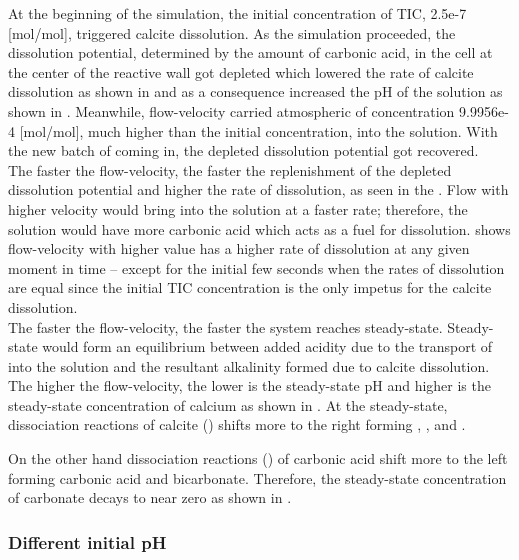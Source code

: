 At the beginning of the simulation, the initial concentration of TIC, 2.5e-7 [mol/mol], triggered calcite dissolution. 
As the simulation proceeded, the dissolution potential, determined by the amount of carbonic acid, in the cell at the center of the reactive wall
got depleted which lowered the rate of calcite dissolution as shown in  and as a consequence increased the pH of the solution as shown in 
. Meanwhile, flow-velocity carried atmospheric  of concentration 9.9956e-4 [mol/mol], much higher 
than the initial concentration, into the solution. With the new batch of  coming in, the depleted dissolution potential got recovered. \\

The faster the flow-velocity, the faster the replenishment of the depleted dissolution potential and 
higher the rate of dissolution, as seen in the . Flow with higher velocity would bring  into the solution at a faster rate; 
therefore, the solution would have more carbonic acid which acts as a fuel for dissolution.  shows flow-velocity with higher value
has a higher rate of dissolution at any given moment in time -- except for the initial few seconds when the rates of dissolution are equal since the 
initial TIC concentration is the only impetus for the calcite dissolution. \\

The faster the flow-velocity, the faster the system reaches steady-state. Steady-state would form an equilibrium between added acidity due to the 
transport of  into the solution and the resultant alkalinity formed due to calcite dissolution. The higher the flow-velocity, 
the lower is the steady-state pH and higher is the steady-state concentration of calcium as shown in .  
At the steady-state, dissociation reactions of calcite () shifts more to the right 
forming , ,  and . 

On the other hand dissociation reactions () of carbonic acid shift more to the left 
forming carbonic acid and bicarbonate. Therefore, the steady-state concentration of carbonate decays to near zero as shown in .


\subsubsection*{Different initial pH} \label{ssec:diffpH}

